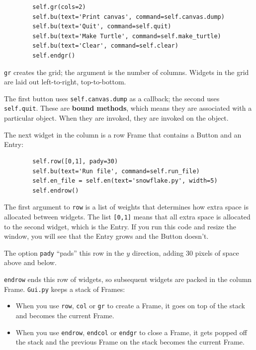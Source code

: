 \documentclass[10pt]{book}
\begin{document}
\begin{verbatim}
        self.gr(cols=2)
        self.bu(text='Print canvas', command=self.canvas.dump)
        self.bu(text='Quit', command=self.quit)
        self.bu(text='Make Turtle', command=self.make_turtle)
        self.bu(text='Clear', command=self.clear)
        self.endgr()
\end{verbatim}
%
{\tt gr} creates the grid; the argument is the number of
columns.  Widgets in the grid are
laid out left-to-right, top-to-bottom.

The first button uses {\tt self.canvas.dump} as a callback; the second
uses {\tt self.quit}.  These are {\bf bound methods}, which means they
are associated with a particular object.  When they are invoked, they
are invoked on the object.

The next widget in the column is a row Frame that contains
a Button and an Entry:

\begin{verbatim}
        self.row([0,1], pady=30)
        self.bu(text='Run file', command=self.run_file)
        self.en_file = self.en(text='snowflake.py', width=5)
        self.endrow()
\end{verbatim}
%
The first argument to {\tt row} is a list of weights that
determines how extra space is allocated between widgets.
The list {\tt [0,1]} means that all extra space is allocated
to the second widget, which is the Entry.  If you run this code
and resize the window, you will see that the Entry grows and
the Button doesn't.

The option {\tt pady} ``pads'' this row in the $y$ direction,
adding 30 pixels of space above and below.

{\tt endrow} ends this row of widgets, so subsequent widgets are
packed in the column Frame.  {\tt Gui.py} keeps a stack of Frames:

\begin{itemize}

\item When you use {\tt row}, {\tt col} or {\tt gr} to create a Frame,
it goes on top of the stack and becomes the current Frame.

\item When you use {\tt endrow}, {\tt endcol} or {\tt endgr} to close
a Frame, it gets popped off the stack and the previous Frame on the
stack becomes the current Frame.

\end{itemize}
\end{document}
